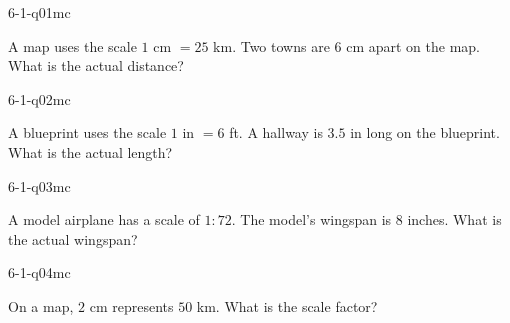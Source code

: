 

\begin{practiceQuestion}{6-1-q01}{mc}
\begin{questionText}
A map uses the scale $1$ cm $= 25$ km. Two towns are $6$ cm apart on the map. What is the actual distance?
\end{questionText}
\end{practiceQuestion}

\begin{practiceQuestion}{6-1-q02}{mc}
\begin{questionText}
A blueprint uses the scale $1$ in $= 6$ ft. A hallway is $3.5$ in long on the blueprint. What is the actual length?
\end{questionText}
\end{practiceQuestion}

\begin{practiceQuestion}{6-1-q03}{mc}
\begin{questionText}
A model airplane has a scale of $1:72$. The model's wingspan is $8$ inches. What is the actual wingspan?
\end{questionText}
\end{practiceQuestion}

\begin{practiceQuestion}{6-1-q04}{mc}
\begin{questionText}
On a map, $2$ cm represents $50$ km. What is the scale factor?
\end{questionText}
\end{practiceQuestion}

